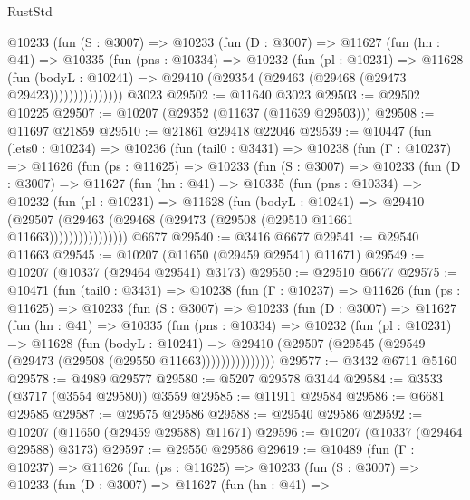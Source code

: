 \begin{lexlean}{RustStd}
\begin{coremodule}
            @10233
              (fun (S : @3007) =>
              @10233
                (fun (D : @3007) =>
                @11627
                  (fun (hn : @41) =>
                  @10335
                    (fun (pns : @10334) =>
                    @10232
                      (fun (pl : @10231) =>
                      @11628
                        (fun (bodyL : @10241) =>
                        @29410 (@29354 (@29463 (@29468 (@29473 @29423)))))))))))))))
    @3023
@29502 := @11640 @3023
@29503 := @29502 @10225
@29507 := @10207 (@29352 (@11637 (@11639 @29503)))
@29508 := @11697 @21859
@29510 := @21861 @29418 @22046
@29539 := @10447
    (fun (lets0 : @10234) =>
    @10236
      (fun (tail0 : @3431) =>
      @10238
        (fun (Γ : @10237) =>
        @11626
          (fun (ps : @11625) =>
          @10233
            (fun (S : @3007) =>
            @10233
              (fun (D : @3007) =>
              @11627
                (fun (hn : @41) =>
                @10335
                  (fun (pns : @10334) =>
                  @10232
                    (fun (pl : @10231) =>
                    @11628
                      (fun (bodyL : @10241) =>
                      @29410
                        (@29507
                          (@29463 (@29468 (@29473 (@29508 (@29510 @11661 @11663))))))))))))))))
    @6677
@29540 := @3416 @6677
@29541 := @29540 @11663
@29545 := @10207 (@11650 (@29459 @29541) @11671)
@29549 := @10207 (@10337 (@29464 @29541) @3173)
@29550 := @29510 @6677
@29575 := @10471
    (fun (tail0 : @3431) =>
    @10238
      (fun (Γ : @10237) =>
      @11626
        (fun (ps : @11625) =>
        @10233
          (fun (S : @3007) =>
          @10233
            (fun (D : @3007) =>
            @11627
              (fun (hn : @41) =>
              @10335
                (fun (pns : @10334) =>
                @10232
                  (fun (pl : @10231) =>
                  @11628
                    (fun (bodyL : @10241) =>
                    @29410 (@29507 (@29545 (@29549 (@29473 (@29508 (@29550 @11663)))))))))))))))
@29577 := @3432 @6711 @5160
@29578 := @4989 @29577
@29580 := @5207 @29578 @3144
@29584 := @3533 (@3717 (@3554 @29580)) @3559
@29585 := @11911 @29584
@29586 := @6681 @29585
@29587 := @29575 @29586
@29588 := @29540 @29586
@29592 := @10207 (@11650 (@29459 @29588) @11671)
@29596 := @10207 (@10337 (@29464 @29588) @3173)
@29597 := @29550 @29586
@29619 := @10489
    (fun (Γ : @10237) =>
    @11626
      (fun (ps : @11625) =>
      @10233
        (fun (S : @3007) =>
        @10233
          (fun (D : @3007) =>
          @11627
            (fun (hn : @41) =>

\end{coremodule}
\end{lexlean}
